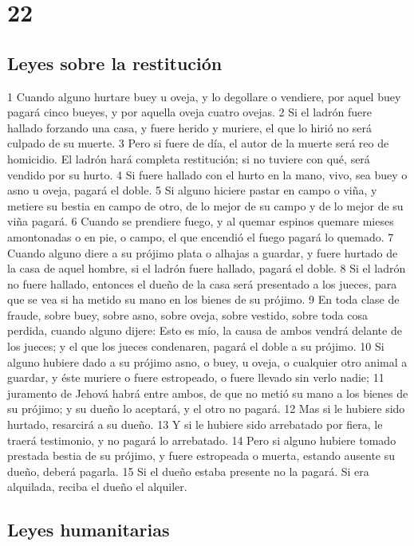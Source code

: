 \chapter{22}

\section{Leyes sobre la restitución}

1 Cuando alguno hurtare buey u oveja, y lo degollare o vendiere, por aquel buey pagará cinco bueyes, y por aquella oveja cuatro ovejas.
2 Si el ladrón fuere hallado forzando una casa, y fuere herido y muriere, el que lo hirió no será culpado de su muerte.
3 Pero si fuere de día, el autor de la muerte será reo de homicidio. El ladrón hará completa restitución; si no tuviere con qué, será vendido por su hurto.
4 Si fuere hallado con el hurto en la mano, vivo, sea buey o asno u oveja, pagará el doble.
5 Si alguno hiciere pastar en campo o viña, y metiere su bestia en campo de otro, de lo mejor de su campo y de lo mejor de su viña pagará.
6 Cuando se prendiere fuego, y al quemar espinos quemare mieses amontonadas o en pie, o campo, el que encendió el fuego pagará lo quemado.
7 Cuando alguno diere a su prójimo plata o alhajas a guardar, y fuere hurtado de la casa de aquel hombre, si el ladrón fuere hallado, pagará el doble.
8 Si el ladrón no fuere hallado, entonces el dueño de la casa será presentado a los jueces, para que se vea si ha metido su mano en los bienes de su prójimo.
9 En toda clase de fraude, sobre buey, sobre asno, sobre oveja, sobre vestido, sobre toda cosa perdida, cuando alguno dijere: Esto es mío, la causa de ambos vendrá delante de los jueces; y el que los jueces condenaren, pagará el doble a su prójimo.
10 Si alguno hubiere dado a su prójimo asno, o buey, u oveja, o cualquier otro animal a guardar, y éste muriere o fuere estropeado, o fuere llevado sin verlo nadie;
11 juramento de Jehová habrá entre ambos, de que no metió su mano a los bienes de su prójimo; y su dueño lo aceptará, y el otro no pagará.
12 Mas si le hubiere sido hurtado, resarcirá a su dueño.
13 Y si le hubiere sido arrebatado por fiera, le traerá testimonio, y no pagará lo arrebatado.
14 Pero si alguno hubiere tomado prestada bestia de su prójimo, y fuere estropeada o muerta, estando ausente su dueño, deberá pagarla.
15 Si el dueño estaba presente no la pagará. Si era alquilada, reciba el dueño el alquiler.

\section{Leyes humanitarias}

